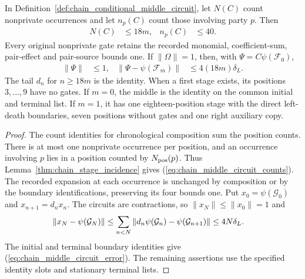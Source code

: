 \begin{lemma}
    \label{thm:chain_conditional_middle_bounds}
    \leanok
    In Definition~\ref{def:chain_conditional_middle_circuit}, let $N(C)$
    count nonprivate occurrences and let $n_p(C)$ count those
    involving party $p$. Then
    \begin{align}
        N(C) & \le18m, & n_p(C) & \le40.
        \label{eq:chain_middle_circuit_counts}
    \end{align}
    Every original nonprivate gate retains the recorded monomial,
    coefficient-sum, pair-effect and pair-source bounds one.
    If $\|\Omega\|=1$, then, with $\Psi=C\psi(\mathcal F_0)$,
    \begin{align}
        \|\Psi\|                    & \le1,              &
        \|\Psi-\psi(\mathcal F_m)\| & \le4(18m)\delta_L.
        \label{eq:chain_middle_circuit_error}
    \end{align}
    The tail $d_n$ for $n\ge18m$ is the identity. When a first stage
    exists, its positions $3,\ldots,9$ have no gates. If $m=0$, the
    middle is the identity on the common initial and terminal list.
    If $m=1$, it has one eighteen-position stage with the direct
    left-death boundaries, seven positions without gates and one right
    auxiliary copy.
\end{lemma}
\begin{proof}\leanok
    The count identities for chronological composition sum the
    position counts. There is at most one nonprivate occurrence per position,
    and an occurrence involving $p$ lies in a position counted by
    $N_{\rm pos}(p)$. Thus Lemma~\ref{thm:chain_stage_incidence} gives
    (\ref{eq:chain_middle_circuit_counts}). The recorded expansion at
    each occurrence is unchanged by composition or by the boundary
    identifications, preserving its four bounds one.
    Put $x_0=\psi(\mathcal G_0)$ and $x_{n+1}=d_nx_n$.
    The circuits are contractions, so $\|x_N\|\le\|x_0\|=1$ and
    \begin{align}
        \|x_N-\psi(\mathcal G_N)\|
         & \le\sum_{n<N}\|d_n\psi(\mathcal G_n)-\psi(\mathcal G_{n+1})\|
        \le4N\delta_L.\notag
    \end{align}
    The initial and terminal boundary identities give
    (\ref{eq:chain_middle_circuit_error}). The remaining assertions use
    the specified identity slots and stationary terminal lists.
\end{proof}

